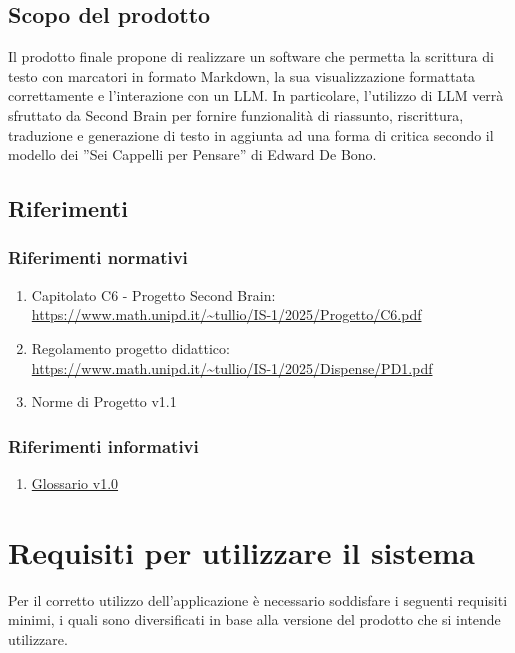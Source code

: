 \documentclass[a4paper,10pt]{article}
\begin{document}
\subsection{Scopo del prodotto}
Il prodotto finale propone di realizzare un software che permetta la scrittura di testo con marcatori in formato Markdown, la sua visualizzazione formattata correttamente e l’interazione con un LLM. In particolare, l’utilizzo di LLM verrà sfruttato da Second Brain per fornire funzionalità di riassunto, riscrittura, traduzione e generazione di testo in aggiunta ad una forma di critica secondo il modello dei ”Sei Cappelli per Pensare” di Edward De Bono. 

\subsection{Riferimenti}
\subsubsection{Riferimenti normativi}
\begin{enumerate}
    \item Capitolato C6 - Progetto Second Brain: \\ \url{https://www.math.unipd.it/~tullio/IS-1/2025/Progetto/C6.pdf}
    \item Regolamento progetto didattico: \\ \url{https://www.math.unipd.it/~tullio/IS-1/2025/Dispense/PD1.pdf}
    \item Norme di Progetto v1.1
\end{enumerate}
\subsubsection{Riferimenti informativi}
\begin{enumerate}
    \item \href{https://tool-8.github.io/Documentazione-SWE/glossario/Glossario.pdf}{Glossario v1.0} 
\end{enumerate}

\section{Requisiti per utilizzare il sistema}
Per il corretto utilizzo dell'applicazione è necessario soddisfare i seguenti requisiti minimi, i quali sono diversificati in base alla versione del prodotto che si intende utilizzare. 
\end{document}
